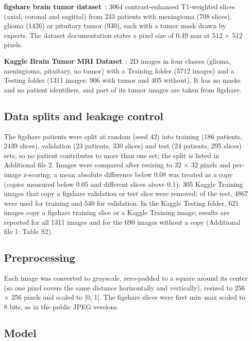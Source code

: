 \documentclass[pdflatex,sn-vancouver-num]{sn-jnl}
\begin{document}
\textbf{figshare brain tumor dataset}~\cite{cheng2015,cheng2016,cheng2017figshare}: 3064 contrast-enhanced T1-weighted slices (axial, coronal and sagittal) from 233 patients with meningioma (708 slices), glioma (1426) or pituitary tumor (930), each with a tumor mask drawn by experts. The dataset documentation states a pixel size of 0.49 mm at 512 $\times$ 512 pixels.

\textbf{Kaggle Brain Tumor MRI Dataset}~\cite{nickparvar2021kaggle}: 2D images in four classes (glioma, meningioma, pituitary, no tumor) with a Training folder (5712 images) and a Testing folder (1311 images: 906 with tumor and 405 without). It has no masks and no patient identifiers, and part of its tumor images are taken from figshare.

\subsection{Data splits and leakage control}

The figshare patients were split at random (seed 42) into training (186 patients, 2439 slices), validation (23 patients, 330 slices) and test (24 patients, 295 slices) sets, so no patient contributes to more than one set; the split is listed in Additional file 2. Images were compared after resizing to 32 $\times$ 32 pixels and per-image z-scoring; a mean absolute difference below 0.08 was treated as a copy (copies measured below 0.05 and different slices above 0.1). 305 Kaggle Training images that copy a figshare validation or test slice were removed; of the rest, 4867 were used for training and 540 for validation. In the Kaggle Testing folder, 621 images copy a figshare training slice or a Kaggle Training image; results are reported for all 1311 images and for the 690 images without a copy (Additional file 1: Table S2).

\subsection{Preprocessing}

Each image was converted to grayscale, zero-padded to a square around its center (so one pixel covers the same distance horizontally and vertically), resized to 256 $\times$ 256 pixels and scaled to [0, 1]. The figshare slices were first min--max scaled to 8 bits, as in the public JPEG versions.

\subsection{Model}
\end{document}
